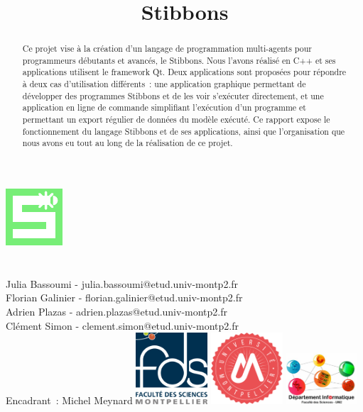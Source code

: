\documentclass[a4paper,11pt]{report}
\newcommand{\+}{\discretionary{\mbox{\scriptsize$\hookleftarrow$}}{}{}}
\begin{document}
\title{Stibbons}

\makeatletter
  \begin{titlepage}
  \centering
        \includegraphics[height=0.2\textheight]{doc/gestionProjet/stibbons.pdf}\\
        \vfill
        {\LARGE \textbf{\@title}}\\
        \vspace{1cm}
		{\large \textbf{\@date}}\\
		\vspace{1cm}
		{\large Julia Bassoumi - julia.bassoumi@etud.univ-montp2.fr\\Florian Galinier - florian.galinier@etud.univ-montp2.fr\\Adrien Plazas - adrien.plazas@etud.univ-montp2.fr\\Clément Simon - clement.simon@etud.univ-montp2.fr\\}
		\vspace{1cm}
		{\large Encadrant~: Michel Meynard}
        \vfill
        \includegraphics[width=0.2\textwidth]{doc/gestionProjet/fds.png}
        \hfill
        \includegraphics[width=0.2\textwidth]{doc/gestionProjet/UM2.png}
        \hfill
        \includegraphics[width=0.2\textwidth]{doc/gestionProjet/depinfo.jpeg}
  \end{titlepage}
\makeatother

\begin{abstract}
Ce projet vise à la création d'un langage de programmation multi-agents pour programmeurs débutants et avancés, le Stibbons. Nous l'avons réalisé en C++ et ses applications utilisent le framework Qt.
Deux applications sont proposées pour répondre à deux cas d'utilisation différents~: une application graphique permettant de développer des programmes Stibbons et de les voir s'exécuter directement, et une application en ligne de commande simplifiant l'exécution d'un programme et permettant un export régulier de données du modèle exécuté.
Ce rapport expose le fonctionnement du langage Stibbons et de ses applications, ainsi que l'organisation que nous avons eu tout au long de la réalisation de ce projet.
\end{abstract}
\end{document}
